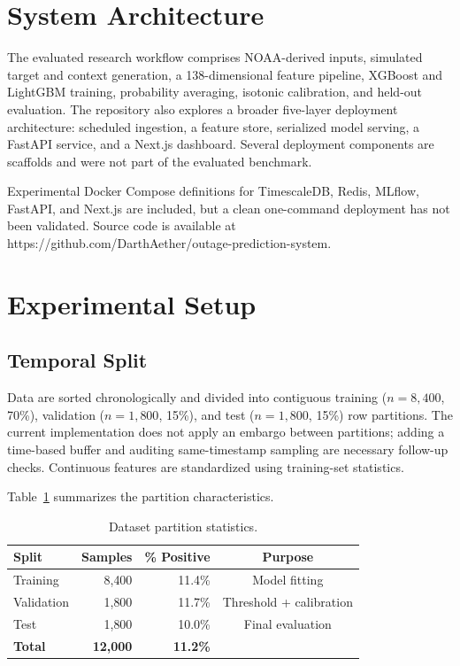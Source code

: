 \documentclass[conference]{IEEEtran}
\begin{document}
\section{System Architecture}\label{sec:architecture}

The evaluated research workflow comprises NOAA-derived inputs, simulated target and context generation, a 138-dimensional feature pipeline, XGBoost and LightGBM training, probability averaging, isotonic calibration, and held-out evaluation. The repository also explores a broader five-layer deployment architecture: scheduled ingestion, a feature store, serialized model serving, a FastAPI service, and a Next.js dashboard. Several deployment components are scaffolds and were not part of the evaluated benchmark.

Experimental Docker Compose definitions for TimescaleDB, Redis, MLflow, FastAPI, and Next.js are included, but a clean one-command deployment has not been validated. Source code is available at https://github.com/DarthAether/outage-prediction-system.

\section{Experimental Setup}\label{sec:experiments}

\subsection{Temporal Split}

Data are sorted chronologically and divided into contiguous training ($n=8{,}400$, 70\%), validation ($n=1{,}800$, 15\%), and test ($n=1{,}800$, 15\%) row partitions. The current implementation does not apply an embargo between partitions; adding a time-based buffer and auditing same-timestamp sampling are necessary follow-up checks. Continuous features are standardized using training-set statistics.

Table~\ref{tab:splits} summarizes the partition characteristics.

\begin{table}[t]
\centering
\caption{Dataset partition statistics.}
\label{tab:splits}
\begin{tabular}{@{}lrrc@{}}
\toprule
\textbf{Split} & \textbf{Samples} & \textbf{\% Positive} & \textbf{Purpose} \\
\midrule
Training & 8{,}400 & 11.4\% & Model fitting \\
Validation & 1{,}800 & 11.7\% & Threshold + calibration \\
Test & 1{,}800 & 10.0\% & Final evaluation \\
\midrule
\textbf{Total} & \textbf{12{,}000} & \textbf{11.2\%} & \\
\bottomrule
\end{tabular}
\end{table}
\end{document}
